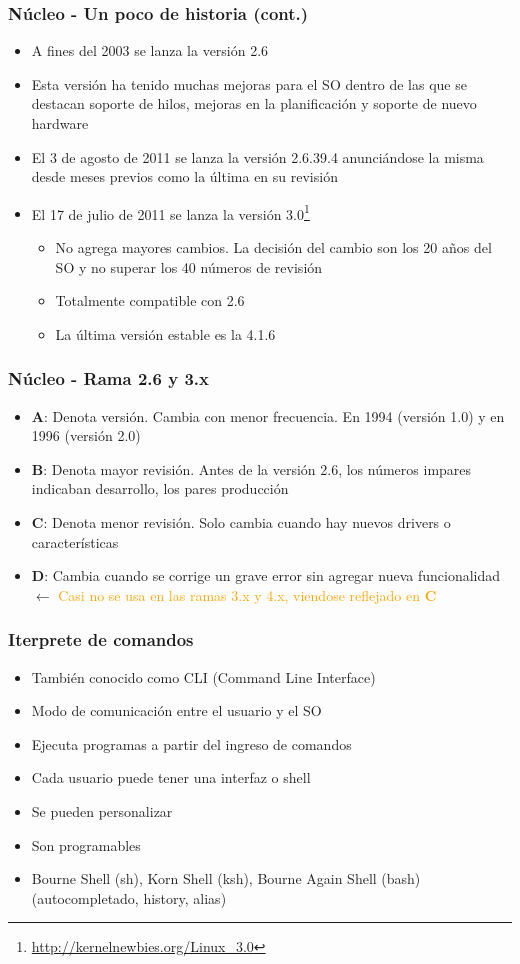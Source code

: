 \begin{frame}
	\frametitle{Núcleo - Un poco de historia (cont.)}
	\begin{itemize}
		\item A fines del 2003 se lanza la versión 2.6		
		\item Esta versión ha tenido muchas mejoras para el SO dentro de las que se destacan soporte de hilos, mejoras en la planificación y soporte de nuevo hardware
		\item El 3 de agosto de 2011 se lanza la versión 2.6.39.4
		anunciándose la misma desde meses previos como la última en su revisión
		\item El 17 de julio de 2011 se lanza la versión 3.0\footnote{\url{http://kernelnewbies.org/Linux_3.0}}
			\begin{itemize}
				\item No agrega mayores cambios. La decisión del cambio son los 20 años del SO y no superar los 40 números de revisión
				\item Totalmente compatible con 2.6
				\item La última versión estable es la 4.1.6
			\end{itemize}
	\end{itemize}
\end{frame}

\begin{frame}
	\frametitle{Núcleo - Rama 2.6 y 3.x}
	\begin{itemize}
		\item \textbf{A}: Denota versión. Cambia con menor frecuencia. En 1994 (versión 1.0) y en 1996 (versión 2.0)
		\item \textbf{B}: Denota mayor revisión. Antes de la versión 2.6, los números impares indicaban desarrollo, los pares producción
		\item \textbf{C}: Denota menor revisión. Solo cambia cuando hay nuevos drivers o características
		\item \textbf{D}: Cambia cuando se corrige un grave error sin agregar nueva funcionalidad $\leftarrow$ \textcolor{orange}{Casi no se usa en las ramas 3.x y 4.x, viendose reflejado en \textbf{C}}
	\end{itemize}
\end{frame}

\begin{frame}
	\frametitle{Iterprete de comandos}
	\begin{itemize}
		\item También conocido como CLI (Command Line Interface)
		\item Modo de comunicación entre el usuario y el SO
		\item Ejecuta programas a partir del ingreso de comandos
		\item Cada usuario puede tener una interfaz o shell
		\item Se pueden personalizar
		\item Son programables
		\item Bourne Shell (sh), Korn Shell (ksh), Bourne Again Shell (bash)(autocompletado, history, alias)
	\end{itemize}
\end{frame}

